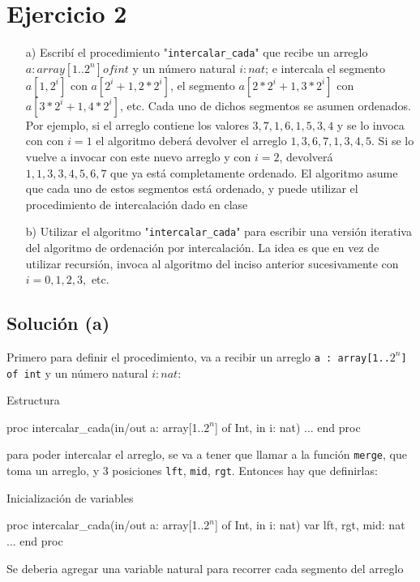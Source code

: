 \section{Ejercicio 2}
\begin{itemize}
    \item[a)] Escribí el procedimiento "\texttt{intercalar\_cada}" que recibe un arreglo $a : array[1..2^n] of int$ y un número natural $i : nat$; e intercala el segmento $a[1, 2^i]$ con $a[2^i + 1, 2 * 2^i]$, el segmento $a[2 * 2^i + 1, 3 * 2^i]$ con $a[3 * 2^i + 1, 4 * 2^i]$, etc. Cada uno de dichos segmentos se asumen ordenados. Por ejemplo, si el arreglo contiene los valores $3, 7, 1, 6, 1, 5, 3, 4$ y se lo invoca con con $i = 1$ el algoritmo deberá devolver el arreglo $1, 3, 6, 7, 1, 3, 4, 5$. Si se lo vuelve a invocar con este nuevo arreglo y con $i = 2$, devolverá $1, 1, 3, 3, 4, 5, 6, 7$ que ya está completamente ordenado. El algoritmo asume que cada uno de estos segmentos está ordenado, y puede utilizar el procedimiento de intercalación dado en clase
    \item[b)] Utilizar el algoritmo "\texttt{intercalar\_cada}" para escribir una versión iterativa del algoritmo de ordenación por intercalación. La idea es que en vez de utilizar recursión, invoca al algoritmo del inciso anterior sucesivamente con $i = 0, 1, 2, 3,$ etc.
  \end{itemize}

\subsection{Solución (a)}
Primero para definir el procedimiento, va a recibir un arreglo \texttt{a : array[1..$2^n$] of int} y un número natural $i : nat$:

\begin{codebox}{Estructura}
\begin{pascallike}
proc intercalar_cada(in/out a: array[1..$2^n$] of Int, in i: nat)
...
end proc
\end{pascallike}
\end{codebox}
para poder intercalar el arreglo, se va a tener que llamar a la función \texttt{merge}, que toma un arreglo, y 3 posiciones \texttt{lft}, \texttt{mid}, \texttt{rgt}. Entonces hay que definirlas:

\begin{codebox}{Inicialización de variables}
\begin{pascallike}
proc intercalar_cada(in/out a: array[1..$2^n$] of Int, in i: nat)
    var lft, rgt, mid: nat
    ...
end proc
\end{pascallike}
\end{codebox}
Se deberia agregar una variable natural para recorrer cada segmento del arreglo

